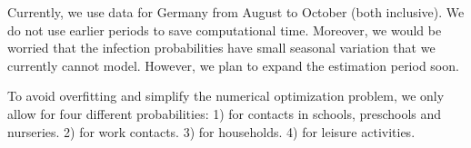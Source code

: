 Currently, we use data for Germany from August to October (both inclusive). We do not use earlier periods to save computational time. Moreover, we would be worried that the infection probabilities have small seasonal variation that we currently cannot model. However, we plan to expand the estimation period soon.

To avoid overfitting and simplify the numerical optimization problem, we only allow for four different probabilities: 1) for contacts in schools, preschools and nurseries. 2) for work contacts. 3) for households. 4) for leisure activities.
